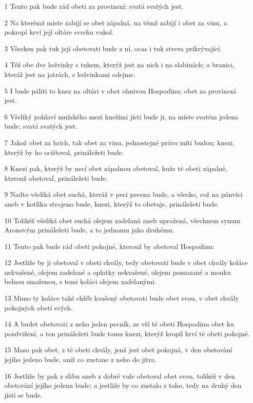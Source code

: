 \par 1 Tento pak bude rád obeti za provinení; svatá svatých jest.
\par 2 Na kterémž míste zabijí se obet zápalná, na témž zabijí i obet za vinu, a pokropí krví její oltáre svrchu vukol.
\par 3 Všecken pak tuk její obetovati bude z ní, ocas i tuk streva prikrývající.
\par 4 Též obe dve ledvinky s tukem, kterýž jest na nich i na slabinách; a branici, kteráž jest na jatrách, s ledvinkami odejme.
\par 5 I bude páliti to knez na oltári v obet ohnivou Hospodinu; obet za provinení jest.
\par 6 Všeliký pohlaví mužského mezi knežími jísti bude ji, na míste svatém jedena bude; svatá svatých jest.
\par 7 Jakož obet za hrích, tak obet za vinu, jednostejné právo míti budou; knezi, kterýž by ho ocištoval, prináležeti bude.
\par 8 Knezi pak, kterýž by necí obet zápalnou obetoval, kuže té obeti zápalné, kterouž obetoval, prináležeti bude.
\par 9 Nadto všeliká obet suchá, kteráž v peci pecena bude, a všecko, což na pánvici aneb v kotlíku strojeno bude, knezi, kterýž to obetuje, prináležeti bude.
\par 10 Tolikéž všeliká obet suchá olejem zadelaná aneb upražená, všechnem synum Aronovým prináležeti bude, a to jednomu jako druhému.
\par 11 Tento pak bude rád obeti pokojné, kterouž by obetoval Hospodinu:
\par 12 Jestliže by ji obetoval v obeti chvály, tedy obetovati bude v obet chvály koláce nekvašené, olejem zadelané a oplatky nekvašené, olejem pomazané a mouku belnou smaženou, s temi koláci olejem zadelanými.
\par 13 Mimo ty koláce také chléb kvašený obetovati bude obet svou, v obet chvály pokojných obetí svých.
\par 14 A budet obetovati z neho jeden pecník, ze vší té obeti Hospodinu obet ku pozdvižení, a ten prináležeti bude tomu knezi, kterýž kropil krví té obeti pokojné.
\par 15 Maso pak obet, z té obeti chvály, jenž jest obet pokojná, v den obetování jejího jedeno bude, aniž co zustane z neho do jitra.
\par 16 Jestliže by pak z slibu aneb z dobré vule obetoval obet svou, tolikéž v den obetování jejího jedena bude; a jestliže by co zustalo z toho, tedy na druhý den jísti se bude.
